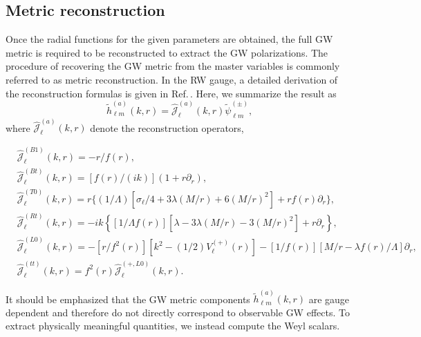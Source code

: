 \documentclass[reprint,amsmath,amssymb,aps,prd]{revtex4-2}
\begin{document}
\subsection{Metric reconstruction}
Once the radial functions for the given parameters are obtained, the full GW metric is required to be reconstructed to extract the GW polarizations. 
The procedure of recovering the GW metric from the master variables is commonly referred to as metric reconstruction.
In the RW gauge, a detailed derivation of the reconstruction formulas is given in Ref.\,\cite{Jhingan_2003}. Here, we summarize the result as
\begin{equation}
\tilde{h}_{\ell m}^{(a)}(k,r)
=\widehat{\mathcal{J}}^{(a)}_{\ell}(k,r)\tilde{\psi}^{(\pm)}_{\ell m},
\end{equation}
where $\widehat{\mathcal{J}}^{(a)}_{\ell}(k,r)$ denote the reconstruction operators,
\begin{widetext}
\begin{subequations}
\begin{align}
&\widehat{\mathcal{J}}^{(B1)}_{\ell}(k,r)=-r/f(r),\\
&\widehat{\mathcal{J}}^{(Bt)}_{\ell}(k,r)=[f(r)/(ik)](1+r\partial_{r}),\\
&\widehat{\mathcal{J}}^{(T0)}_{\ell}(k,r)=r\{(1/\Lambda)[\sigma_{\ell}/4+3\lambda(M/r)+6(M/r)^2]+rf(r)\partial_{r}\},\\
&\widehat{\mathcal{J}}^{(Rt)}_{\ell}(k,r)=-ik\left\{[1/\Lambda f(r)][\lambda-3\lambda(M/r)-3(M/r)^2]+r\partial_{r}\right\},\\
&\widehat{\mathcal{J}}^{(L0)}_{\ell}(k,r)
=-[r/f^2(r)]
[k^2-(1/2)V_{\ell}^{(+)}(r)]-[1/f(r)][M/r-\lambda f(r)/\Lambda]\partial_{r},\\
&\widehat{\mathcal{J}}^{(tt)}_{\ell}(k,r)=f^2(r)\widehat{\mathcal{J}}^{(+,L0)}_{\ell}(k,r).
\end{align}
\end{subequations}
\end{widetext}
It should be emphasized that the GW metric components $\tilde{h}_{\ell m}^{(a)}(k,r)$ are gauge dependent and therefore do not directly correspond to observable GW effects. To extract physically meaningful quantities, we instead compute the Weyl scalars.
\end{document}
